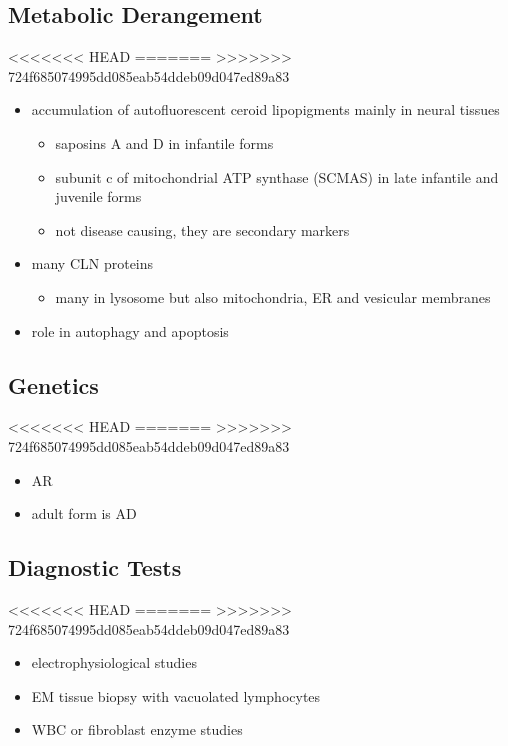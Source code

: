 \documentclass[fontsize=12pt]{scrartcl}
\begin{document}
\begin{enumerate}
\begin{enumerate}
\begin{enumerate}
\begin{enumerate}
\begin{table}[htbp]
\begin{enumerate}
\begin{enumerate}
\begin{enumerate}
\subsection{Metabolic Derangement}
<<<<<<< HEAD
\label{sec:org7ea30e6}
=======
\label{sec:orgda0ecd1}
>>>>>>> 724f685074995dd085eab54ddeb09d047ed89a83
\begin{itemize}
\item accumulation of autofluorescent ceroid lipopigments mainly in
neural tissues
\begin{itemize}
\item saposins A and D in infantile forms
\item subunit c of mitochondrial ATP synthase (SCMAS) in late infantile
and juvenile forms
\item not disease causing, they are secondary markers
\end{itemize}
\item many CLN proteins
\begin{itemize}
\item many in lysosome but also mitochondria, ER and vesicular membranes
\end{itemize}
\item role in autophagy and apoptosis
\end{itemize}

\subsection{Genetics}
<<<<<<< HEAD
\label{sec:orgc1d3a26}
=======
\label{sec:org769744b}
>>>>>>> 724f685074995dd085eab54ddeb09d047ed89a83
\begin{itemize}
\item AR
\item adult form is AD
\end{itemize}

\subsection{Diagnostic Tests}
<<<<<<< HEAD
\label{sec:org72d70e3}
=======
\label{sec:org35a7bb5}
>>>>>>> 724f685074995dd085eab54ddeb09d047ed89a83
\begin{itemize}
\item electrophysiological studies
\item EM tissue biopsy with vacuolated lymphocytes
\item WBC or fibroblast enzyme studies
\end{itemize}


\end{enumerate}
\end{enumerate}
\end{enumerate}
\end{table}
\end{enumerate}
\end{enumerate}
\end{enumerate}
\end{enumerate}
\end{document}
